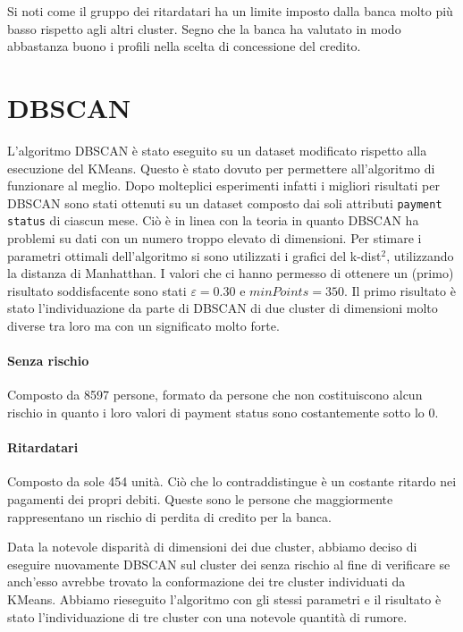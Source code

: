 Si noti come il gruppo dei ritardatari ha un limite 
imposto dalla banca molto pi\`u basso rispetto 
agli altri cluster. Segno che la banca ha valutato 
in modo abbastanza buono i profili nella scelta 
di concessione del credito.

\section{DBSCAN}
L'algoritmo DBSCAN \`e stato eseguito su un dataset
modificato rispetto alla esecuzione del KMeans.
Questo \`e stato dovuto per permettere all'algoritmo
di funzionare al meglio. Dopo molteplici esperimenti
infatti i migliori risultati per DBSCAN sono stati ottenuti
su un dataset composto dai soli attributi 
\texttt{payment status} di ciascun mese. Ci\`o \`e in linea
con la teoria in quanto DBSCAN ha problemi su dati con un 
numero troppo elevato di dimensioni.
Per stimare i parametri ottimali dell'algoritmo si sono
utilizzati i grafici del k-dist$^2$, utilizzando la 
distanza di Manhatthan. I valori che ci hanno permesso di
ottenere un (primo) risultato soddisfacente sono stati
$\varepsilon=0.30$ e $minPoints=350$.
Il primo risultato \`e stato l'individuazione da parte
di DBSCAN di due cluster di dimensioni molto diverse tra
loro ma con un significato molto forte.

\paragraph{Senza rischio}
Composto da 8597 persone, formato da persone che non
costituiscono alcun rischio in quanto i loro valori 
di payment status sono costantemente sotto lo 0.

\paragraph{Ritardatari}
Composto da sole 454 unit\`a. Ci\`o che lo contraddistingue
\`e un costante ritardo nei pagamenti dei propri debiti.
Queste sono le persone che maggiormente rappresentano
un rischio di perdita di credito per la banca.

Data la notevole disparit\`a di dimensioni dei due cluster, 
abbiamo deciso di eseguire nuovamente DBSCAN sul cluster
dei senza rischio al fine di verificare se anch'esso avrebbe
trovato la conformazione dei tre cluster individuati da KMeans.
Abbiamo rieseguito l'algoritmo con gli stessi parametri e il
risultato \`e stato l'individuazione di tre cluster con una 
notevole quantit\`a di rumore. 

